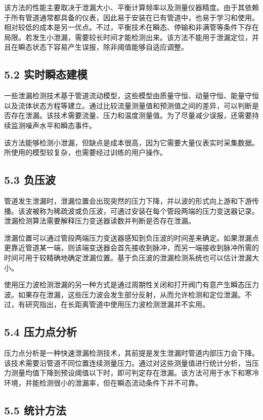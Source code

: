 该方法的性能主要取决于泄漏大小、平衡计算频率以及测量仪器精度。由于其依赖于所有管道通常都具备的仪表，因此易于安装在已有管道中，也易于学习和使用。相对较低的成本是另一优点。不过，平衡技术在瞬态、停输和非满管等条件下存在局限。若发生小泄漏，需要较长时间才能检测出来。该方法不能用于泄漏定位，并且在瞬态状态下容易产生误报，除非阈值能够自适应调整。

\subsection*{5.2 实时瞬态建模}

一些泄漏检测技术基于管道流动模型，这些模型由质量守恒、动量守恒、能量守恒以及流体状态方程等建立。通过比较流量测量值和预测值之间的差异，可以判断是否存在泄漏。该技术需要流量、压力和温度测量值。为了尽量减少误报，还需要持续监测噪声水平和瞬态事件。

该方法能够检测小泄漏，但缺点是成本很高，因为它需要大量仪表实时采集数据。所使用的模型较复杂，也需要经过训练的用户操作。

\subsection*{5.3 负压波}

管道发生泄漏时，泄漏位置会出现突然的压力下降，并以波的形式向上游和下游传播。该波被称为稀疏波或负压波，可通过安装在每个管段两端的压力变送器记录。泄漏检测算法需要解释压力变送器读数并判断是否存在泄漏。

泄漏位置可以通过管段两端压力变送器感知到负压波的时间差来确定。如果泄漏点更靠近管道某一端，则该端变送器会首先接收到脉冲，而另一端接收到脉冲所需的时间可用于较精确地确定泄漏位置。基于负压波的泄漏检测系统也可以估计泄漏大小。

使用压力波检测泄漏的另一种方式是通过周期性关闭和打开阀门有意产生瞬态压力波。如果存在泄漏，这些压力波会发生部分反射，从而允许检测和定位泄漏。不过，有研究指出，在长距离管道中使用压力波检测泄漏并不实用。

\subsection*{5.4 压力点分析}

压力点分析是一种快速泄漏检测技术，其前提是发生泄漏时管道内部压力会下降。该技术需要沿管道不同位置连续测量压力。通过对这些测量值进行统计分析，当压力测量均值下降到预设阈值以下时，即可判定存在泄漏。该方法可用于水下和寒冷环境，并能检测很小的泄漏率，但在瞬态流动条件下并不可靠。

\subsection*{5.5 统计方法}

